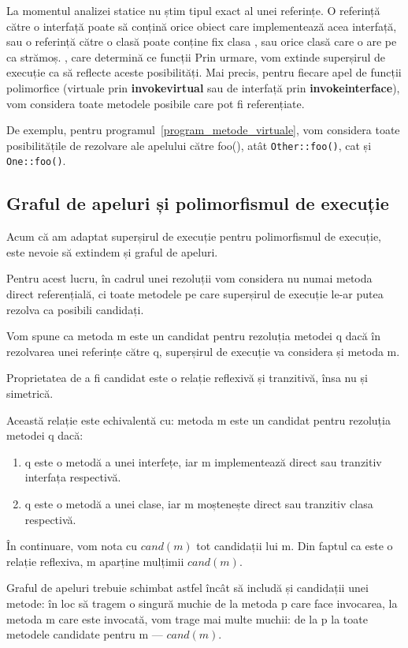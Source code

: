 La momentul analizei statice nu știm tipul exact al unei referințe.
O referință către o interfață poate să conțină orice obiect care implementează
acea interfață, sau o referință către o clasă  poate conține fix clasa
, sau orice clasă care o are pe  ca strămoș.
, care determină ce funcții
Prin urmare, vom extinde superșirul de execuție ca să reflecte aceste
posibilități.
Mai precis, pentru fiecare apel de funcții polimorfice (virtuale prin
\textbf{invokevirtual} sau de interfață prin \textbf{invokeinterface}), vom
considera toate metodele posibile care pot fi referențiate.

De exemplu, pentru programul~\ref{program_metode_virtuale}, vom considera toate
posibilitățile de rezolvare ale apelului către foo(), atât \texttt{Other::foo()},
cat și \texttt{One::foo()}.

\subsection{Graful de apeluri și polimorfismul de execuție}

Acum că am adaptat superșirul de execuție pentru polimorfismul de execuție, este
nevoie să extindem și graful de apeluri.

Pentru acest lucru, în cadrul unei rezoluții vom considera nu numai metoda
direct referențială, ci toate metodele pe care superșirul de execuție le-ar
putea rezolva ca posibili candidați.

Vom spune ca metoda m este un candidat pentru rezoluția metodei q dacă în
rezolvarea unei referințe către q, superșirul de execuție va considera și metoda
m.

Proprietatea de a fi candidat este o relație reflexivă și tranzitivă, însa nu și
simetrică.

Această relație este echivalentă cu: metoda m este un candidat pentru rezoluția
metodei q dacă:
\begin{enumerate}
    \item q este o metodă a unei interfețe, iar m implementează direct sau
        tranzitiv interfața respectivă.
    \item q este o metodă a unei clase, iar m moștenește direct sau tranzitiv
        clasa respectivă.
\end{enumerate}

În continuare, vom nota cu $cand(m)$ \label{cand} tot candidații lui m. Din faptul ca este o
relație reflexiva, m aparține mulțimii $cand(m)$.

Graful de apeluri trebuie schimbat astfel încât să includă și candidații unei
metode: în loc să tragem o singură muchie de la metoda p care face invocarea, la
metoda m care este invocată, vom trage mai multe muchii: de la p la toate
metodele candidate pentru m --- $cand(m)$.

